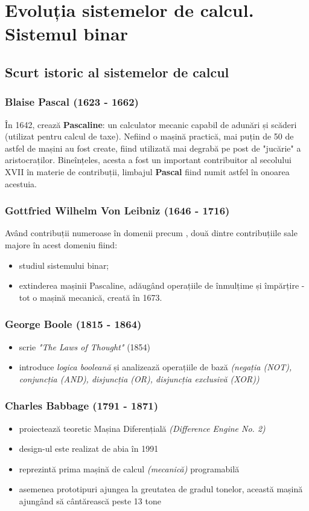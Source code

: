 \documentclass[a4paper,10pt]{article}
\begin{document}
\section{Evoluția sistemelor de calcul. Sistemul binar}
\subsection{Scurt istoric al sistemelor de calcul}
\begin{multicols}{2}
\subsubsection{Blaise Pascal (1623 - 1662)}
În 1642, crează \textbf{Pascaline}: un calculator mecanic capabil de adunări și scăderi (utilizat pentru calcul de taxe). Nefiind o mașină practică, mai puțin de 50 de astfel de mașini au fost create, fiind utilizată mai degrabă pe post de "jucărie" a aristocraților. Bineînțeles, acesta a fost un important contribuitor al secolului XVII în materie de contribuții, limbajul \textbf{Pascal} fiind numit astfel în onoarea acestuia. 
\subsubsection{Gottfried Wilhelm Von Leibniz (1646 - 1716)}
Având contribuții numeroase în domenii precum , două dintre contribuțiile sale majore în acest domeniu fiind:
\begin{itemize}
    \item studiul sistemului binar;
    \item extinderea mașinii Pascaline, adăugând operațiile de înmulțime și împărțire - tot o mașină mecanică, creată în 1673.
\end{itemize}
\subsubsection{George Boole (1815 - 1864)}
\begin{itemize}
    \item scrie \textit{"The Laws of Thought"} (1854)
    \item introduce \textit{logica booleană} și analizează operațiile de bază \textit{(negația (NOT), conjuncția (AND), disjuncția (OR), disjuncția exclusivă (XOR))}
\end{itemize}
\subsubsection{Charles Babbage (1791 - 1871)}
\begin{itemize}
    \item proiectează teoretic Mașina Diferențială \textit{(Difference Engine No. 2)}
    \item design-ul este realizat de abia în 1991
    \item reprezintă prima mașină de calcul \textit{(mecanică)} programabilă
    \item asemenea prototipuri ajungea la greutatea de gradul tonelor, această mașină ajungând să cântărească peste 13 tone
\end{itemize}

\end{multicols}
\end{document}
